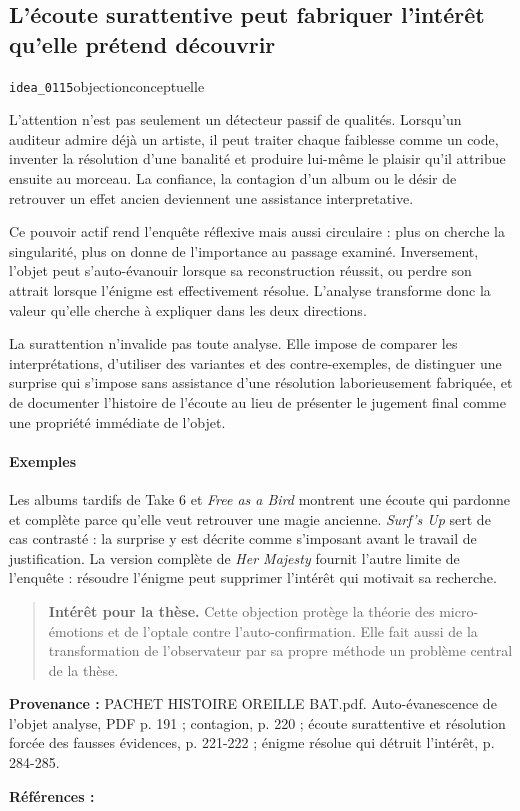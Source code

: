 \documentclass[10pt,a4paper]{article}
\begin{document}
\subsection{L'écoute surattentive peut fabriquer l'intérêt qu'elle prétend découvrir}
{\small\color{metadata} \texttt{idea\_0115}\quad\textbullet\quad objection\quad\textbullet\quad conceptuelle\par}

L'attention n'est pas seulement un détecteur passif de qualités. Lorsqu'un auditeur admire déjà un artiste, il peut traiter chaque faiblesse comme un code, inventer la résolution d'une banalité et produire lui-même le plaisir qu'il attribue ensuite au morceau. La confiance, la contagion d'un album ou le désir de retrouver un effet ancien deviennent une assistance interpretative.

Ce pouvoir actif rend l'enquête réflexive mais aussi circulaire : plus on cherche la singularité, plus on donne de l'importance au passage examiné. Inversement, l'objet peut s'auto-évanouir lorsque sa reconstruction réussit, ou perdre son attrait lorsque l'énigme est effectivement résolue. L'analyse transforme donc la valeur qu'elle cherche à expliquer dans les deux directions.

La surattention n'invalide pas toute analyse. Elle impose de comparer les interprétations, d'utiliser des variantes et des contre-exemples, de distinguer une surprise qui s'impose sans assistance d'une résolution laborieusement fabriquée, et de documenter l'histoire de l'écoute au lieu de présenter le jugement final comme une propriété immédiate de l'objet.

\paragraph{Exemples}
Les albums tardifs de Take 6 et \emph{Free as a Bird} montrent une écoute qui pardonne et complète parce qu'elle veut retrouver une magie ancienne. \emph{Surf's Up} sert de cas contrasté : la surprise y est décrite comme s'imposant avant le travail de justification. La version complète de \emph{Her Majesty} fournit l'autre limite de l'enquête : résoudre l'énigme peut supprimer l'intérêt qui motivait sa recherche.

\begin{quote}
\textbf{Intérêt pour la thèse.} Cette objection protège la théorie des micro-émotions et de l'optale contre l'auto-confirmation. Elle fait aussi de la transformation de l'observateur par sa propre méthode un problème central de la thèse.
\end{quote}
{\footnotesize\color{metadata}\textbf{Provenance :} PACHET HISTOIRE OREILLE BAT.pdf. Auto-évanescence de l'objet analyse, PDF p. 191 ; contagion, p. 220 ; écoute surattentive et résolution forcée des fausses évidences, p. 221-222 ; énigme résolue qui détruit l'intérêt, p. 284-285.\par}
{\footnotesize\color{metadata}\textbf{Références :} \parencite{pachet2018oreille}\par}
\end{document}

